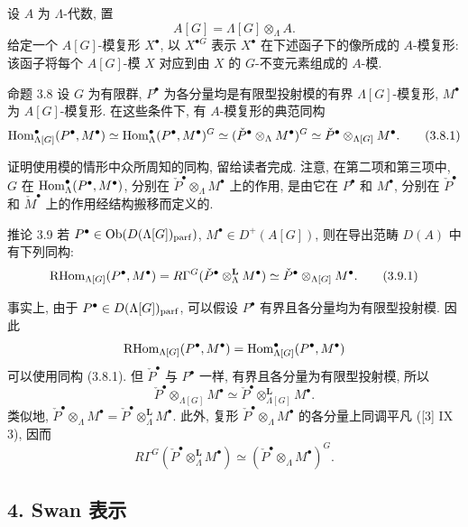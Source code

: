 设 $A$ 为 $\Lambda$-代数, 置
\[
A[G]=\Lambda[G]\otimes_\Lambda A.
\]
给定一个 $A[G]$-模复形 $X^\bullet$, 以 $X^{\bullet G}$ 表示 $X^\bullet$ 在下述函子下的像所成的 $A$-模复形: 该函子将每个 $A[G]$-模 $X$ 对应到由 $X$ 的 $G$-不变元素组成的 $A$-模.

\begin{statement}{命题 3.8}
设 $G$ 为有限群, $P^\bullet$ 为各分量均是有限型投射模的有界 $\Lambda[G]$-模复形, $M^\bullet$ 为 $A[G]$-模复形. 在这些条件下, 有 $A$-模复形的典范同构
\[
\operatorname{Hom}_{\Lambda[G]}^\bullet(P^\bullet,M^\bullet)
\simeq \operatorname{Hom}_\Lambda^\bullet(P^\bullet,M^\bullet)^G
\simeq (\check P^\bullet\otimes_\Lambda M^\bullet)^G
\simeq \check P^\bullet\otimes_{\Lambda[G]}M^\bullet.
\tag{3.8.1}
\]
\end{statement}

证明使用模的情形中众所周知的同构, 留给读者完成. 注意, 在第二项和第三项中, $G$ 在 $\operatorname{Hom}_\Lambda^\bullet(P^\bullet,M^\bullet)$, 分别在 $\check P^\bullet\otimes_\Lambda M^\bullet$ 上的作用, 是由它在 $P^\bullet$ 和 $M^\bullet$, 分别在 $\check P^\bullet$ 和 $\check M^\bullet$ 上的作用经结构搬移而定义的.

\begin{statement}{推论 3.9}
若 $P^\bullet\in\operatorname{Ob}(D(\Lambda[G])_{\mathrm{parf}})$, $M^\bullet\in D^+(A[G])$, 则在导出范畴 $D(A)$ 中有下列同构:
\[
\mathrm{RHom}_{\Lambda[G]}(P^\bullet,M^\bullet)
=R\Gamma^G(\check P^\bullet\otimes_\Lambda^{\mathbf L}M^\bullet)
\simeq \check P^\bullet\otimes_{\Lambda[G]}M^\bullet.
\tag{3.9.1}
\]
\end{statement}

事实上, 由于 $P^\bullet\in D(\Lambda[G])_{\mathrm{parf}}$, 可以假设 $P^\bullet$ 有界且各分量均为有限型投射模. 因此
\[
\mathrm{RHom}_{\Lambda[G]}(P^\bullet,M^\bullet)=\operatorname{Hom}_{\Lambda[G]}^\bullet(P^\bullet,M^\bullet)
\]
可以使用同构 (3.8.1). 但 $\check P^\bullet$ 与 $P^\bullet$ 一样, 有界且各分量为有限型投射模, 所以
\[
\check P^\bullet\otimes_{\Lambda[G]}M^\bullet\simeq
\check P^\bullet\otimes_{\Lambda[G]}^{\mathbf L}M^\bullet.
\]
类似地, $\check P^\bullet\otimes_\Lambda M^\bullet=\check P^\bullet\otimes_\Lambda^{\mathbf L}M^\bullet$. 此外, 复形 $\check P^\bullet\otimes_\Lambda M^\bullet$ 的各分量上同调平凡 ([3] IX 3), 因而
\[
R\Gamma^G(\check P^\bullet\otimes_\Lambda^{\mathbf L}M^\bullet)
\simeq (\check P^\bullet\otimes_\Lambda M^\bullet)^G.
\]

\subsection*{4. Swan 表示}

